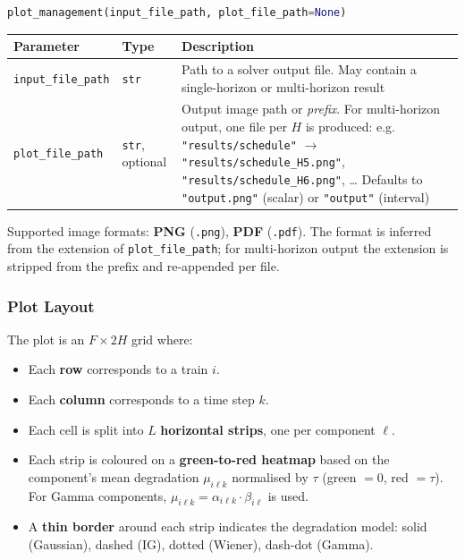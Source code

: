 \documentclass[11pt,a4paper]{article}
\begin{document}
\begin{lstlisting}[language=Python]
plot_management(input_file_path, plot_file_path=None)
\end{lstlisting}

\begin{longtable}{@{}llp{7.5cm}@{}}
\toprule
Parameter & Type & Description \\
\midrule
\texttt{input\_file\_path} & \texttt{str} & Path to a solver output file.
  May contain a single-horizon or multi-horizon result \\
\texttt{plot\_file\_path} & \texttt{str}, optional & Output image path or \emph{prefix}.
  For multi-horizon output, one file per $H$ is produced:
  e.g. \texttt{"results/schedule"} $\to$
  \texttt{"results/schedule\_H5.png"}, \texttt{"results/schedule\_H6.png"}, \ldots
  Defaults to \texttt{"output.png"} (scalar) or \texttt{"output"} (interval) \\
\bottomrule
\end{longtable}

Supported image formats: \textbf{PNG} (\texttt{.png}), \textbf{PDF} (\texttt{.pdf}).
The format is inferred from the extension of \texttt{plot\_file\_path}; for multi-horizon
output the extension is stripped from the prefix and re-appended per file.

\subsubsection{Plot Layout}

The plot is an $F \times 2H$ grid where:
\begin{itemize}
  \item Each \textbf{row} corresponds to a train $i$.
  \item Each \textbf{column} corresponds to a time step $k$.
  \item Each cell is split into $L$ \textbf{horizontal strips}, one per component $\ell$.
  \item Each strip is coloured on a \textbf{green-to-red heatmap} based on the
        component's mean degradation $\mu_{i\ell k}$ normalised by $\tau$
        (green $= 0$, red $= \tau$). For Gamma components,
        $\mu_{i\ell k} = \alpha_{i\ell k}\cdot\beta_{i\ell}$ is used.
  \item A \textbf{thin border} around each strip indicates the degradation model:
        solid (Gaussian), dashed (IG), dotted (Wiener), dash-dot (Gamma).
\end{itemize}
\end{document}

